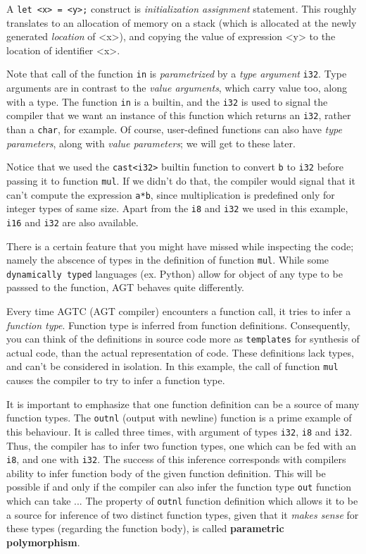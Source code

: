 \documentclass[times, utf8, diplomski]{fer}
\begin{document}
A \texttt{let <x> = <y>;} construct is \textit{initialization assignment} statement.
This roughly translates to an allocation of memory on a stack (which is allocated at the newly
generated \textit{location} of <x>), and copying the value of expression <y>
to the location of identifier <x>.

Note that call of the function \texttt{in} is \textit{parametrized} by a \textit{type argument} \texttt{i32}.
Type arguments are in contrast to the \textit{value arguments}, which carry value too, along with a type.
The function \texttt{in} is a builtin, and the \texttt{i32} is used to signal the compiler
that we want an instance of this function which returns an \texttt{i32}, 
rather than a \texttt{char}, for example. 
Of course, user-defined functions can also have \textit{type parameters}, along with \textit{value parameters};
we will get to these later.

Notice that we used the \texttt{cast<i32>} builtin function to convert \texttt{b} to \texttt{i32}
before passing it to function \texttt{mul}. If we didn't do that, the compiler would signal that it can't
compute the expression \texttt{a*b}, since multiplication is predefined only for integer types of same size.
Apart from the \texttt{i8} and \texttt{i32} we used in this example, \texttt{i16} and \texttt{i32} are also
available.

There is a certain feature that you might have missed while inspecting the code; namely the abscence of
types in the definition of function \texttt{mul}.
While some \texttt{dynamically typed} languages (ex. Python) allow for object of any type to be passsed
to the function, AGT behaves quite differently. 

Every time AGTC (AGT compiler) encounters a function call,
it tries to infer a \textit{function type}. Function type is inferred from function definitions. 
Consequently, you can think of the definitions in source code more as \texttt{templates} for synthesis
of actual code, than the actual representation of code. 
These definitions lack types, and can't be considered in isolation.
In this example, the call of function \texttt{mul} causes the compiler to try to infer a function type.

It is important to emphasize that one function definition can be a source of many function types.
The \texttt{outnl} (output with newline) function is a prime example of this behaviour.
It is called three times, with argument of types \texttt{i32}, \texttt{i8} and \texttt{i32}.
Thus, the compiler has to infer two function types, 
one which can be fed with an \texttt{i8}, and one with \texttt{i32}.
The success of this inference corresponds with compilers ability to infer function body of
the given function definition.
This will be possible if and only if the compiler can also infer the function type \texttt{out} 
function which can take ...
The property of \texttt{outnl} function definition which allows it to be a source for inference
of two distinct function types, given that it \textit{makes sense} for these types 
(regarding the function body), is called \textbf{parametric polymorphism}.
\end{document}
